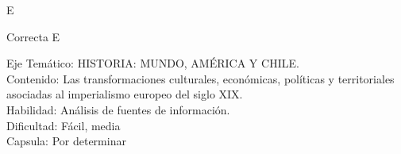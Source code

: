 \documentclass[letterpaper,11pt]{article}
\newcommand{\anchopregunta}{0.9\textwidth}
\begin{document}
\begin{enumerate}
\begin{minipage}{\anchopregunta}
\begin{key} E
\end{key} 
\begin{hint}
\end{hint}
\begin{answer} Correcta E\\
\end{answer}
\begin{info} %
\begin{flushleft}
Eje Temático: HISTORIA: MUNDO, AMÉRICA Y CHILE.\\
Contenido: Las transformaciones culturales, económicas, políticas y territoriales
asociadas al imperialismo europeo del siglo XIX.\\
Habilidad: Análisis de fuentes de información.\\
Dificultad: Fácil, media\\
Capsula: Por determinar\\
\end{flushleft} 
\end{info}
\end{minipage}\vfill$\;$ %


\end{enumerate}
\end{document}
